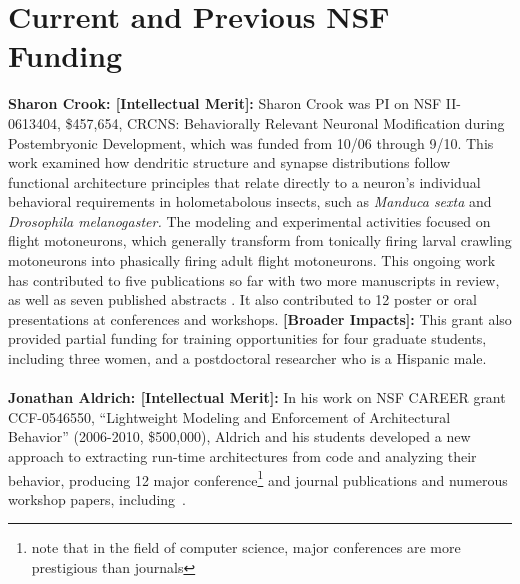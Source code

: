 \documentclass[11pt,letterpaper]{article}
\newcommand{\bfhead}[1]{\noindent \textbf{#1:}}
\begin{document}
\section{Current and Previous NSF Funding}
\bfhead{Sharon Crook: [Intellectual Merit]} Sharon Crook was PI on NSF II-0613404, \$457,654, CRCNS: Behaviorally Relevant Neuronal Modification during Postembryonic Development, which was funded from 10/06 through 9/10. 
This work examined how dendritic structure and synapse distributions follow functional architecture principles that relate directly to a neuron's individual behavioral requirements in holometabolous insects, such as \textit{Manduca sexta} and \textit{Drosophila melanogaster.} 
The modeling and experimental activities focused on flight motoneurons, which generally transform from tonically firing larval crawling motoneurons into phasically firing adult flight motoneurons. 
This ongoing work has contributed to five publications so far \cite{hohensee, meseke, herrera-valdez_2012, ryglewski_2012, herrera-valdez_jcns_2013} with two more manuscripts in review, 
as well as seven published abstracts \cite{jennings_2007, herrera-valdez_2009, berger_2009, herrera-valdez_2010, smith_2011, berger_2012, berger_2013}. 
It also contributed to 12 poster or oral presentations at conferences and workshops. 
\bfhead{[Broader Impacts]} This grant also provided partial funding for training opportunities for four graduate students, including three women, and a postdoctoral researcher who is a Hispanic male. 
\\\\
\bfhead{Jonathan Aldrich: [Intellectual Merit]} In his work on NSF CAREER grant
CCF-0546550, ``Lightweight Modeling and Enforcement of
Architectural Behavior'' (2006-2010, \$500,000), Aldrich and his
students developed a new approach to extracting
run-time architectures from code and analyzing their
behavior, producing 12 major conference\footnote{note that in the field of computer science, major conferences are more prestigious than journals} and journal publications and numerous workshop papers,
including~\cite{AAC07,bierhoff07:modular_typestate_checking,AAN+08,AA07a,AA07b,AA08d,AA09a,AA09b,AB10}.
\end{document}
